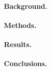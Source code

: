 \paragraph{Background.}
\lipsum[11]
\paragraph{Methods.}
\lipsum[11]
\paragraph{Results.}
\lipsum[11]
\paragraph{Conclusions.}
\lipsum[11]

